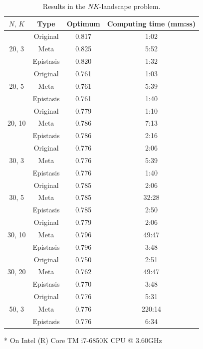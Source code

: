 \begin{table}[ht!]
	\centering
	\begin{threeparttable}
		\caption{Results in the $ NK $-landscape problem.} \label{tab:result_nk}
		\begin{tabular}{cccc}
			\toprule
			$ N,\, K$ & Type & Optimum & Computing time (mm:ss)\tnote{*} \\
			\midrule
			\multirow{3}{*}{20, 3}	& Original		& 0.817 & 1:02 \\
			& Meta			& 0.825 & 5:52 \\
			& Epistasis		& 0.820 & 1:32 \\
			\midrule
			\multirow{3}{*}{20, 5}	& Original		& 0.761 & 1:03 \\
			& Meta			& 0.761 & 5:39 \\
			& Epistasis		& 0.761 & 1:40 \\
			\midrule
			\multirow{3}{*}{20, 10}	& Original		& 0.779 & 1:10 \\
			& Meta			& 0.786 & 7:13 \\
			& Epistasis		& 0.786 & 2:16 \\
			\midrule
			\multirow{3}{*}{30, 3}	& Original		& 0.776 & 2:06 \\
			& Meta			& 0.776 & 5:39 \\
			& Epistasis		& 0.776 & 1:40 \\
			\midrule
			\multirow{3}{*}{30, 5}	& Original		& 0.785 & 2:06 \\
			& Meta			& 0.785 & 32:28 \\
			& Epistasis		& 0.785 & 2:50 \\
			\midrule
			\multirow{3}{*}{30, 10}	& Original		& 0.779 & 2:06 \\
			& Meta			& 0.796 & 49:47 \\
			& Epistasis		& 0.796 & 3:48 \\
			\midrule
			\multirow{3}{*}{30, 20}	& Original		& 0.750 & 2:51 \\
			& Meta			& 0.762 & 49:47 \\
			& Epistasis		& 0.770 & 3:48 \\
			\midrule
			\multirow{3}{*}{50, 3}	& Original		& 0.776 & 5:31 \\
			& Meta			& 0.776 & 220:14 \\
			& Epistasis		& 0.776 & 6:34 \\
			\bottomrule
		\end{tabular}
		\begin{tablenotes}
			\footnotesize
			\item[*] On Intel (R) Core TM i7-6850K CPU @ 3.60GHz
		\end{tablenotes}
	\end{threeparttable}
\end{table}


